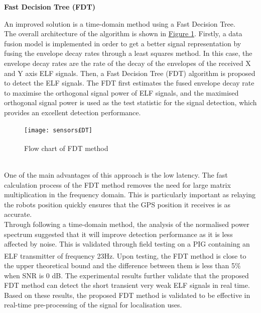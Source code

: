 \documentclass[11pt]{article}		%
\newcommand{\supercite}[1]{\textsuperscript{\cite{#1}}}		%
\newcommand{\figref}[1]{\hyperref[#1]{Figure \ref*{#1}}}    %
\begin{document}
		    \textbf{Fast Decision Tree (FDT)}
		    
		    \begin{floatingfigure}[r]{0pt} \end{floatingfigure}
			An improved solution is a time-domain method using a Fast Decision Tree. 
			\\
	    	\hspace*{2ex}The overall architecture of the algorithm is shown in \figref{FDTFlowchart}. 
	    	Firstly, a data fusion model is implemented in order to get a better signal representation by fusing the envelope decay rates through a least squares method. 
	    	In this case, the envelope decay rates are the rate of the decay of the envelopes of the received X and Y axis ELF signals. 
	    	Then, a Fast Decision Tree (FDT) algorithm is proposed to detect the ELF signals. 
	    	The FDT first estimates the fused envelope decay rate to maximise the orthogonal signal power of ELF signals, and the maximised orthogonal signal power is used as the test statistic for the signal detection, which provides an excellent detection performance.
	         \begin{figure}[h]
				\centering
				\texttt{[image: sensors£DT]}
				\caption{Flow chart of FDT method\supercite{FDT}}
				\label{FDTFlowchart}
			\end{figure}
			\\
            \hspace*{2ex}One of the main advantages of this approach is the low latency. 
			The fast calculation process of the FDT method removes the need for large matrix multiplication in the frequency domain. 
			This is particularly important as relaying the robots position quickly ensures that the GPS position it receives is as accurate. 
			\\
	    	\hspace*{2ex}Through following a time-domain method, the analysis of the normalised power spectrum suggested that it will improve detection performance as it is less affected by noise. 
	    	This is validated through field testing on a PIG containing an ELF transmitter of frequency 23Hz\supercite{FDT}. 
	    	Upon testing, the FDT method is close to the upper theoretical bound and the difference between them is less than 5\% when SNR is 0 dB.
	    	The experimental results further validate that the proposed FDT method can detect the short transient very weak ELF signals in real time. 
	    	Based on these results, the proposed FDT method is validated to be effective in real-time pre-processing of the signal for localisation uses.
			
\end{document}
